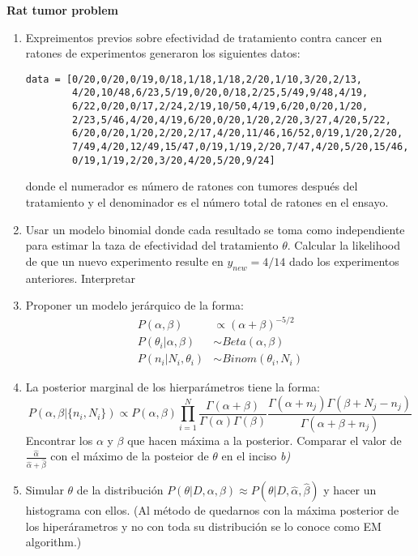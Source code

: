 \documentclass[12pt]{paper}
\begin{document}
\begin{enumerate}
\textbf{Rat tumor problem}
\begin{enumerate}
\item Expreimentos previos sobre efectividad de tratamiento contra cancer en ratones de experimentos generaron los siguientes datos:
\begin{verbatim}
data = [0/20,0/20,0/19,0/18,1/18,1/18,2/20,1/10,3/20,2/13,
        4/20,10/48,6/23,5/19,0/20,0/18,2/25,5/49,9/48,4/19,
        6/22,0/20,0/17,2/24,2/19,10/50,4/19,6/20,0/20,1/20,
        2/23,5/46,4/20,4/19,6/20,0/20,1/20,2/20,3/27,4/20,5/22,
        6/20,0/20,1/20,2/20,2/17,4/20,11/46,16/52,0/19,1/20,2/20,
        7/49,4/20,12/49,15/47,0/19,1/19,2/20,7/47,4/20,5/20,15/46,
        0/19,1/19,2/20,3/20,4/20,5/20,9/24]
\end{verbatim}
donde el numerador es número de ratones con tumores después del tratamiento y el denominador es el número total de ratones en el ensayo. 
\item Usar un modelo binomial donde cada resultado se toma como independiente para estimar la taza de efectividad del tratamiento $\theta$. Calcular la likelihood de que un nuevo experimento resulte en $y_{new} = 4/14$ dado los experimentos anteriores. Interpretar
\item Proponer un modelo jerárquico de la forma:
\begin{align}
P(\alpha,\beta) &\propto (\alpha + \beta)^{-5/2}\\
P(\theta_{i}|\alpha,\beta) &\sim Beta(\alpha,\beta)\\
P(n_{i}|N_{i},\theta_{i}) &\sim Binom(\theta_{i},N_{i})
\end{align}
\item La posterior marginal de los hierparámetros tiene la forma:
\begin{equation}
P(\alpha,\beta|\{n_{i},N_{i}\}) \propto P(\alpha,\beta) \prod_{i=1}^{N}\frac{\Gamma(\alpha+\beta)}{\Gamma(\alpha)\Gamma(\beta)}\frac{\Gamma(\alpha+n_{j})\Gamma(\beta + N_{j}-n_{j})}{\Gamma(\alpha + \beta + n_{j})}
\end{equation}
Encontrar los $\alpha$ y $\beta$ que hacen máxima a la posterior. Comparar el valor de $\frac{\hat{\alpha}}{\hat{\alpha}+\hat{\beta}}$ con el máximo de la posteior de $\theta$ en el inciso \textit{b)}

\item Simular $\theta$ de la distribución $P(\theta|D,\alpha,\beta) \approx P(\theta|D,\hat{\alpha},\hat{\beta})$ y hacer un histograma con ellos. (Al método de quedarnos con la máxima posterior de los hiperárametros y no con toda su distribución se lo conoce como EM algorithm.)


\end{enumerate}
\end{enumerate}
\end{document}
